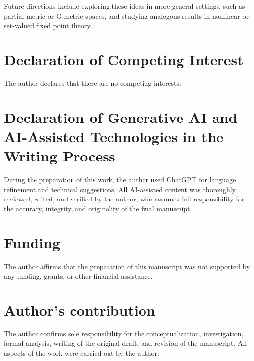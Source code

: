 \documentclass{birkjour}
\theoremstyle{definition}
\theoremstyle{remark}
\numberwithin{equation}{section}
\begin{document}
Future directions include exploring these ideas in more general settings, such as partial metric or G-metric spaces, and studying analogous results in nonlinear or set-valued fixed point theory.



\newpage
\vspace{0.5cm}
\section*{Declaration of Competing Interest}
\noindent The author declares that there are no competing interests.

\section*{Declaration of Generative AI and AI-Assisted Technologies in the Writing Process}
During the preparation of this work, the author used ChatGPT for language refinement and technical suggestions. All AI-assisted content was thoroughly reviewed, edited, and verified by the author, who assumes full responsibility for the accuracy, integrity, and originality of the final manuscript.

\section*{Funding}
The author affirms that the preparation of this manuscript was not supported by any funding, grants, or other financial assistance.  

\section*{Author's contribution}
The author confirms sole responsibility for the conceptualization, investigation, formal analysis, writing of the original draft, and revision of the manuscript. All aspects of the work were carried out by the author.







\end{document}
